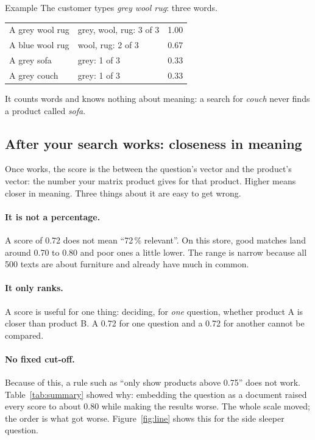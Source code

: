 \documentclass[11pt]{article}
\begin{document}
\begin{example}{Example}
The customer types \emph{grey wool rug}: three words.
\par\smallskip
\begin{tabularx}{\linewidth}{@{}X l r@{}}
A grey wool rug & grey, wool, rug: 3 of 3 & 1.00 \\
A blue wool rug & wool, rug: 2 of 3 & 0.67 \\
A grey sofa & grey: 1 of 3 & 0.33 \\
A grey couch & grey: 1 of 3 & 0.33 \\
\end{tabularx}
\par\smallskip
It counts words and knows nothing about meaning: a search for
\emph{couch} never finds a product called \emph{sofa}.
\end{example}

\subsection{After your search works: closeness in meaning}

Once  works, the score is the  between the question's vector
and the product's vector: the number your matrix product
 gives for that product. Higher means
closer in meaning. Three things about it are easy to get wrong.

\paragraph{It is not a percentage.} A score of 0.72 does not mean
``72\,\% relevant''. On this store, good matches land around 0.70 to
0.80 and poor ones a little lower. The range is narrow because all 500
texts are about furniture and already have much in common.

\paragraph{It only ranks.} A score is useful for one thing: deciding,
for \emph{one} question, whether product A is closer than product B.
A 0.72 for one question and a 0.72 for another cannot be compared.

\paragraph{No fixed cut-off.} Because of this, a rule such as ``only
show products above 0.75'' does not work. Table~\ref{tab:summary}
showed why: embedding the question as a document raised every score to
about 0.80 while making the results worse. The whole scale moved; the
order is what got worse. Figure~\ref{fig:line} shows this for the side
sleeper question.
\end{document}
